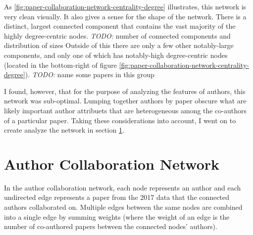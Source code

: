 \documentclass{article}
\newcommand{\todo}[1]{\textit{TODO:} #1}
\begin{document}
As \ref{fig:paper-collaboration-network-centrality-degree} illustrates, this network is very clean visually.
It also gives a sense for the shape of the network.
There is a distinct, largest connected component that contains the vast majority of the highly degree-centric nodes.
\todo{number of connected components and distribution of sizes}
Outside of this there are only a few other notably-large components, and only one of which has notably-high degree-centric nodes (located in the bottom-right of figure \ref{fig:paper-collaboration-network-centrality-degree}).
\todo{name some papers in this group}

I found, however, that for the purpose of analyzing the features of authors, this network was sub-optimal.
Lumping together authors by paper obscure what are likely important author attribuets that are heterogeneous among the co-authors of a particular paper. Taking these considerations into account, I went on to create analyze the network in section \ref{sec:author-collaboration-network}.

\section{Author Collaboration Network}
\label{sec:author-collaboration-network}

In the author collaboration network, each node represents an author and each undirected edge represents a paper from the 2017 data that the connected authors collaborated on.
Multiple edges between the same nodes are combined into a single edge by summing weights (where the weight of an edge is the number of co-authored papers between the connected nodes' authors).
\end{document}
